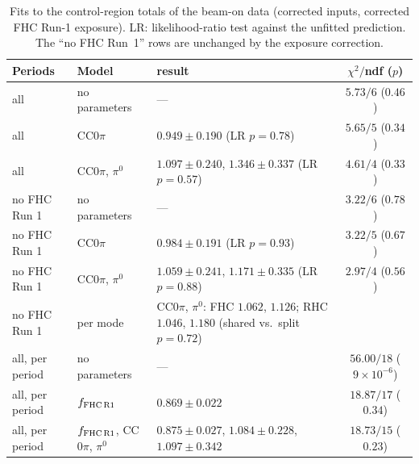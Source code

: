 \documentclass[11pt,a4paper]{article}
\begin{document}
\begin{table}[H]
  \centering
  \caption{Fits to the control-region totals of the beam-on data (corrected inputs, corrected FHC Run-1
    exposure). LR: likelihood-ratio test against the unfitted prediction. The ``no FHC Run~1'' rows are
    unchanged by the exposure correction.}
  \label{tab:fit_data}
  \footnotesize\setlength{\tabcolsep}{4pt}
  \begin{tabular}{llp{}c}
    \toprule
    Periods & Model & result & $\chi^2/$ndf ($p$) \\
    \midrule
    all & no parameters & --- & $5.73/6$ ($0.46$) \\
    all & CC$0\pi$ & $0.949\pm0.190$ (LR $p=0.78$) & $5.65/5$ ($0.34$) \\
    all & CC$0\pi$, $\pi^0$ & $1.097\pm0.240$, $1.346\pm0.337$ (LR $p=0.57$) & $4.61/4$ ($0.33$) \\
    no FHC Run 1 & no parameters & --- & $3.22/6$ ($0.78$) \\
    no FHC Run 1 & CC$0\pi$ & $0.984\pm0.191$ (LR $p=0.93$) & $3.22/5$ ($0.67$) \\
    no FHC Run 1 & CC$0\pi$, $\pi^0$ & $1.059\pm0.241$, $1.171\pm0.335$ (LR $p=0.88$) & $2.97/4$ ($0.56$) \\
    no FHC Run 1 & per mode & CC$0\pi$, $\pi^0$: FHC $1.062$, $1.126$; RHC $1.046$, $1.180$ (shared vs.\ split $p=0.72$) & \\
    all, per period & no parameters & --- & $56.00/18$ ($9\times10^{-6}$) \\
    all, per period & $f_{\rm FHC\,R1}$ & $0.869\pm0.022$ & $18.87/17$ ($0.34$) \\
    all, per period & $f_{\rm FHC\,R1}$, CC$0\pi$, $\pi^0$ & $0.875\pm0.027$, $1.084\pm0.228$, $1.097\pm0.342$ & $18.73/15$ ($0.23$) \\
    \bottomrule
  \end{tabular}
\end{table}
\end{document}
